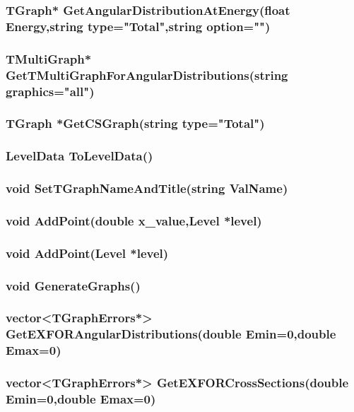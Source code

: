 \documentclass[a4paper,12pt]{extarticle}
\begin{document}
\subsubsection{TGraph* GetAngularDistributionAtEnergy(float Energy,string type="Total",string option="")}

\subsubsection{TMultiGraph* GetTMultiGraphForAngularDistributions(string graphics="all")}

\subsubsection{TGraph *GetCSGraph(string type="Total")}

\subsubsection{LevelData ToLevelData()}

\subsubsection{void SetTGraphNameAndTitle(string ValName)}

\subsubsection{void AddPoint(double x\_value,Level *level)}

\subsubsection{void AddPoint(Level *level)}

\subsubsection{void GenerateGraphs()}

\subsubsection{vector<TGraphErrors*> GetEXFORAngularDistributions(double Emin=0,double Emax=0)}

\subsubsection{vector<TGraphErrors*> GetEXFORCrossSections(double Emin=0,double Emax=0)}
\end{document}
